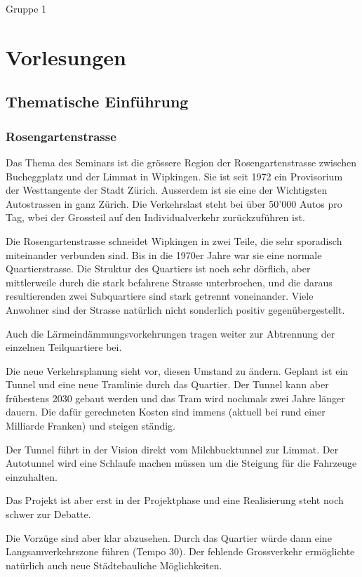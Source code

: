 \documentclass[a4paper,11pt,ngerman]{article}
\begin{document}
Gruppe 1

\section{Vorlesungen}
\label{sec-2}

\subsection{Thematische Einführung}
\label{sec-2-1}

\subsubsection{Rosengartenstrasse}
\label{sec-2-1-1}

Das Thema des Seminars ist die grössere Region der Rosengartenstrasse
zwischen Bucheggplatz und der Limmat in Wipkingen. Sie ist seit 1972 ein
Provisorium der Westtangente der Stadt Zürich. Ausserdem ist sie eine der
Wichtigsten Autostrassen in ganz Zürich. Die Verkehrslast steht bei über
50'000 Autos pro Tag, wbei der Grossteil auf den Individualverkehr
zurückzuführen ist.

Die Rosengartenstrasse schneidet Wipkingen in zwei Teile, die sehr
sporadisch miteinander verbunden sind. Bis in die 1970er Jahre war sie eine
normale Quartierstrasse. Die Struktur des Quartiers ist noch sehr dörflich,
aber mittlerweile durch die stark befahrene Strasse unterbrochen, und die
daraus resultierenden zwei Subquartiere sind stark getrennt
voneinander. Viele Anwohner sind der Strasse natürlich nicht sonderlich
positiv gegenübergestellt.

Auch die Lärmeindämmungsvorkehrungen tragen weiter zur Abtrennung der
einzelnen Teilquartiere bei.

Die neue Verkehrsplanung sieht vor, diesen Umstand zu ändern. Geplant ist
ein Tunnel und eine neue Tramlinie durch das Quartier. Der Tunnel kann aber
frühestens 2030 gebaut werden und das Tram wird nochmals zwei Jahre länger
dauern. Die dafür gerechneten Kosten sind immens (aktuell bei rund einer
Milliarde Franken) und steigen ständig.

Der Tunnel führt in der Vision direkt vom Milchbucktunnel zur Limmat. Der
Autotunnel wird eine Schlaufe machen müssen um die Steigung für die
Fahrzeuge einzuhalten.

Das Projekt ist aber erst in der Projektphase und eine Realisierung steht
noch schwer zur Debatte.

Die Vorzüge sind aber klar abzusehen. Durch das Quartier würde dann eine
Langsamverkehrszone führen (Tempo 30). Der fehlende Grossverkehr
ermöglichte natürlich auch neue Städtebauliche Möglichkeiten.
\end{document}
